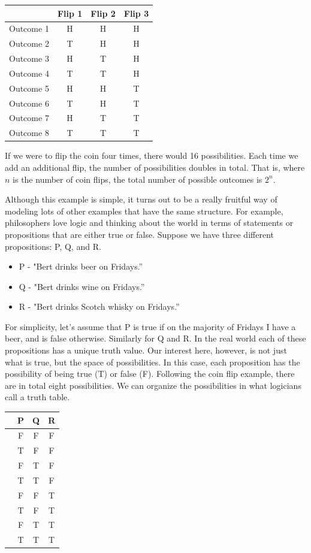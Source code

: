 \documentclass[]{tufte-book}
\providecommand{\tightlist}{%
  \setlength{\itemsep}{0pt}\setlength{\parskip}{0pt}}
\begin{document}
\begin{longtable}[]{@{}lccc@{}}
\toprule
& Flip 1 & Flip 2 & Flip 3\tabularnewline
\midrule
\endhead
Outcome 1 & H & H & H\tabularnewline
Outcome 2 & T & H & H\tabularnewline
Outcome 3 & H & T & H\tabularnewline
Outcome 4 & T & T & H\tabularnewline
Outcome 5 & H & H & T\tabularnewline
Outcome 6 & T & H & T\tabularnewline
Outcome 7 & H & T & T\tabularnewline
Outcome 8 & T & T & T\tabularnewline
\bottomrule
\end{longtable}

If we were to flip the coin four times, there would 16 possibilities. Each time we add an additional flip, the number of possibilities doubles in total. That is, where \(n\) is the number of coin flips, the total number of possible outcomes is \(2^n\).

Although this example is simple, it turns out to be a really fruitful way of modeling lots of other examples that have the same structure. For example, philosophers love logic and thinking about the world in terms of statements or propositions that are either true or false. Suppose we have three different propositions: P, Q, and R.

\begin{itemize}
\tightlist
\item
  P - "Bert drinks beer on Fridays.''
\item
  Q - "Bert drinks wine on Fridays.''
\item
  R - "Bert drinks Scotch whisky on Fridays.''
\end{itemize}

For simplicity, let's assume that P is true if on the majority of Fridays I have a beer, and is false otherwise. Similarly for Q and R. In the real world each of these propositions has a unique truth value. Our interest here, however, is not just what is true, but the space of possibilities. In this case, each proposition has the possibility of being true (T) or false (F). Following the coin flip example, there are in total eight possibilities. We can organize the possibilities in what logicians call a truth table.

\begin{longtable}[]{@{}lccc@{}}
\toprule
& P & Q & R\tabularnewline
\midrule
\endhead
& F & F & F\tabularnewline
& T & F & F\tabularnewline
& F & T & F\tabularnewline
& T & T & F\tabularnewline
& F & F & T\tabularnewline
& T & F & T\tabularnewline
& F & T & T\tabularnewline
& T & T & T\tabularnewline
\bottomrule
\end{longtable}
\end{document}
